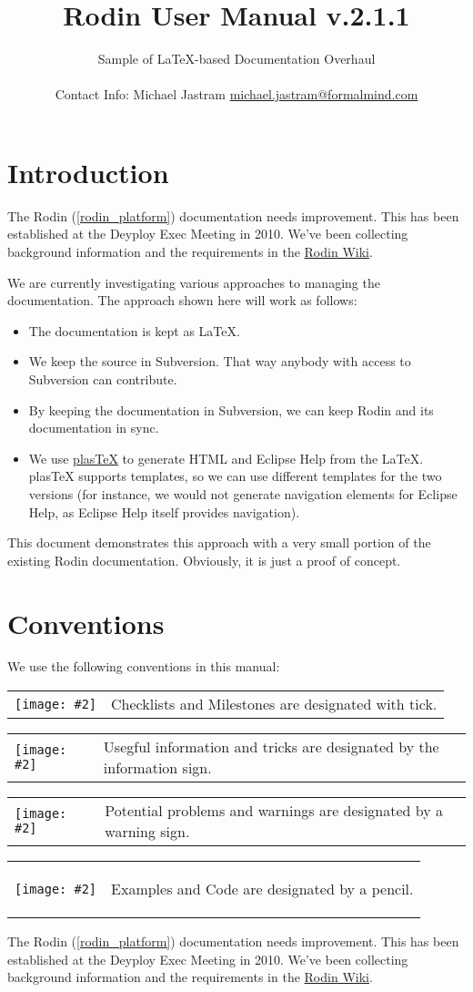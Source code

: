 \documentclass{book}
\title{Rodin User Manual v.2.1.1}
\author{Sample of \LaTeX-based Documentation Overhaul\\ \\
Contact Info: Michael Jastram \href{mailto:michael.jastram@formalmind.com}{michael.jastram@formalmind.com}}
\def\doculist#1#2{
  \vspace{3mm}
  \noindent
  \begin{tabular}{lp{0.85\textwidth}}
    \texttt{[image: \#2]} & \vspace{-10mm}#1\\
  \end{tabular}
}
\def\tick#1{\doculist{#1}{img/tick_64.png}}
\def\info#1{\doculist{#1}{img/info_64.png}}
\def\warning#1{\doculist{#1}{img/warning_64.png}}
\def\pencil#1{\doculist{\vspace{-5mm}#1}{img/pencil_64.png}}
\begin{document}
        

\maketitle

\section*{Introduction}

The Rodin (\ref{rodin_platform}) documentation needs improvement.  This has been established at the Deyploy Exec Meeting in 2010.  We've been collecting background information and the requirements in the \href{http://wiki.event-b.org/index.php/User_Documentation_Overhaul}{Rodin Wiki}.

We are currently investigating various approaches to managing the documentation.  The approach shown here will work as follows:

\begin{itemize}
\item The documentation is kept as \LaTeX.
\item We keep the source in Subversion.  That way anybody with access to Subversion can contribute.
\item By keeping the documentation in Subversion, we can keep Rodin and its documentation in sync.
\item We use \href{http://plastex.sourceforge.net/}{plasTeX} to generate HTML and Eclipse Help from the \LaTeX.  plasTeX supports templates, so we can use different templates for the two versions (for instance, we would not generate navigation elements for Eclipse Help, as Eclipse Help itself provides navigation).
\end{itemize}

This document demonstrates this approach with a very small portion of the existing Rodin documentation.  Obviously, it is just a proof of concept.

\section*{Conventions}

We use the following conventions in this manual:

\tick{Checklists and Milestones are designated with tick.}
\info{Usegful information and tricks are designated by the information sign.}
\warning{Potential problems and warnings are designated by a warning sign.}
\pencil{\begin{description} \item Examples and Code are designated by a pencil.\end{description}}

The Rodin (\ref{rodin_platform}) documentation needs improvement.  This has been established at the Deyploy Exec Meeting in 2010.  We've been collecting background information and the requirements in the \href{http://wiki.event-b.org/index.php/User_Documentation_Overhaul}{Rodin Wiki}.







\end{document}
